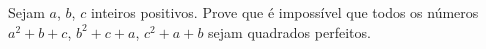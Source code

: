 Sejam \(a\), \(b\), \(c\) inteiros positivos.
Prove que é impossível que todos os números \(a^2 + b + c\), \(b^2 + c + a\), \(c^2 + a + b\) sejam quadrados perfeitos. 
